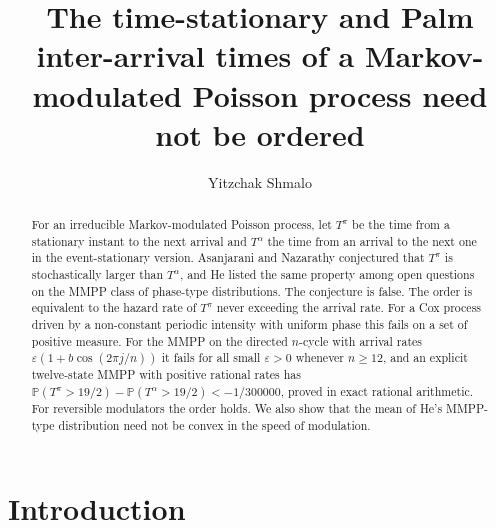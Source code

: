\documentclass[11pt]{amsart}
\title[MMPP inter-arrival times need not be ordered]{The time-stationary and Palm inter-arrival times of a Markov-modulated Poisson process need not be ordered}
\author{Yitzchak Shmalo}
\theoremstyle{remark}
\newcommand{\Pp}{\mathbb P}
\begin{document}
\begin{abstract}
For an irreducible Markov-modulated Poisson process, let $T^\pi$ be the time from a stationary instant to the next arrival and $T^\alpha$ the time from an arrival to the next one in the event-stationary version. Asanjarani and Nazarathy conjectured that $T^\pi$ is stochastically larger than $T^\alpha$, and He listed the same property among open questions on the MMPP class of phase-type distributions. The conjecture is false. The order is equivalent to the hazard rate of $T^\pi$ never exceeding the arrival rate. For a Cox process driven by a non-constant periodic intensity with uniform phase this fails on a set of positive measure. For the MMPP on the directed $n$-cycle with arrival rates $\varepsilon(1+b\cos(2\pi j/n))$ it fails for all small $\varepsilon>0$ whenever $n\ge 12$, and an explicit twelve-state MMPP with positive rational rates has $\Pp(T^\pi>19/2)-\Pp(T^\alpha>19/2)<-1/300000$, proved in exact rational arithmetic. For reversible modulators the order holds. We also show that the mean of He's MMPP-type distribution need not be convex in the speed of modulation.
\end{abstract}
\maketitle

\section{Introduction}
\end{document}
